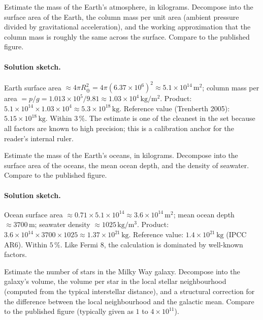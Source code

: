 \begin{exercise}
Estimate the mass of the Earth's atmosphere, in kilograms. Decompose
into the surface area of the Earth, the column mass per unit area
(ambient pressure divided by gravitational acceleration), and the
working approximation that the column mass is roughly the same
across the surface. Compare to the published figure.
\end{exercise}

\paragraph{Solution sketch.}
Earth surface area $\approx 4\pi R_{\oplus}^{2} = 4\pi (6.37 \times
10^{6})^{2} \approx 5.1 \times 10^{14} \,\si{\meter\squared}$;
column mass per area $= p/g = 1.013 \times 10^{5} / 9.81 \approx
1.03 \times 10^{4} \,\si{\kilo\gram\per\meter\squared}$. Product:
$5.1 \times 10^{14} \times 1.03 \times 10^{4} \approx 5.3 \times
10^{18} \,\si{\kilo\gram}$. Reference value (Trenberth 2005):
$5.15 \times 10^{18} \,\si{\kilo\gram}$. Within $3\,\%$. The
estimate is one of the cleanest in the set because all factors are
known to high precision; this is a calibration anchor for the
reader's internal ruler.

\begin{exercise}
Estimate the mass of the Earth's oceans, in kilograms. Decompose
into the surface area of the oceans, the mean ocean depth, and the
density of seawater. Compare to the published figure.
\end{exercise}

\paragraph{Solution sketch.}
Ocean surface area $\approx 0.71 \times 5.1 \times 10^{14}
\approx 3.6 \times 10^{14} \,\si{\meter\squared}$; mean ocean
depth $\approx 3700 \,\si{\meter}$; seawater density $\approx
1025 \,\si{\kilo\gram\per\meter\cubed}$. Product: $3.6 \times
10^{14} \times 3700 \times 1025 \approx 1.37 \times 10^{21}
\,\si{\kilo\gram}$. Reference value: $1.4 \times 10^{21}
\,\si{\kilo\gram}$ (IPCC AR6). Within $5\,\%$. Like Fermi 8, the
calculation is dominated by well-known factors.

\begin{exercise}
Estimate the number of stars in the Milky Way galaxy. Decompose
into the galaxy's volume, the volume per star in the local stellar
neighbourhood (computed from the typical interstellar distance),
and a structural correction for the difference between the local
neighbourhood and the galactic mean. Compare to the published
figure (typically given as $1$ to $4 \times 10^{11}$).
\end{exercise}

